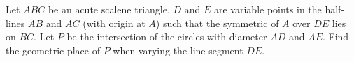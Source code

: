 Let $ABC$ be an acute scalene triangle. $D$ and $E$ are variable points in the half-lines $AB$ and $AC$ (with origin at $A$) such that the symmetric of $A$ over $DE$ lies on $BC$. Let $P$ be the intersection of the circles with diameter $AD$ and $AE$. Find the geometric place of $P$ when varying the line segment $DE$.